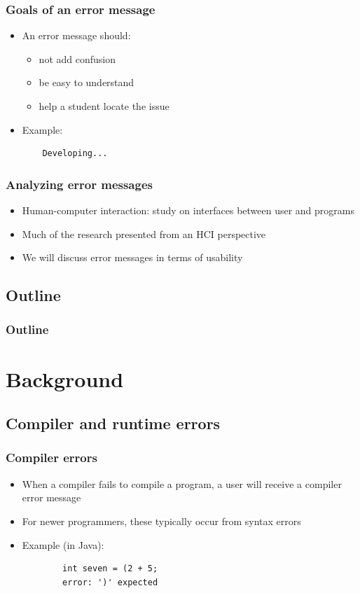 \documentclass{beamer}
\begin{document}
\begin{frame}[fragile]
  \frametitle{Goals of an error message}
  \begin{itemize}
  	\item An error message should:
  	\begin{itemize}
  		\item not add confusion
  		\item be easy to understand
  		\item help a student locate the issue
  	\end{itemize}
  	\item Example:
  	\begin{verbatim}
  	Developing...
  	\end{verbatim}
  \end{itemize}
\end{frame}

\begin{frame}
 \frametitle{Analyzing error messages}
 \begin{itemize}
 	\item Human-computer interaction: study on interfaces between user and programs
 	\item Much of the research presented from an HCI perspective
 	\item We will discuss error messages in terms of usability
 \end{itemize}
\end{frame}

\subsection*{Outline}

\begin{frame}
  \frametitle{Outline}
  \tableofcontents[hideallsubsections]
\end{frame}

\section[Background]{Background}

\subsection{Compiler and runtime errors}

\begin{frame}[fragile]
	\frametitle{Compiler errors}
		\begin{itemize}
			\item When a compiler fails to compile a program, a user will receive a compiler error message
			\item For newer programmers, these typically occur from syntax errors
			\item Example (in Java):
			\begin{verbatim}
		int seven = (2 + 5;
		error: ')' expected
			\end{verbatim}
		\end{itemize}
\end{frame}
\end{document}

